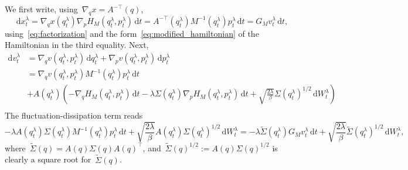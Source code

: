 \documentclass[10pt]{article}
\renewcommand{\d}{\mathrm{d}}
\newcommand{\1}{\mathbbm 1}
\begin{document}
We first write, using~$\nabla_q x = A^{-\top}(q)$,
\begin{equation}
    \d x_t^\lambda = \nabla_q x(q_t^\lambda)\nabla_p H_M(q_t^\lambda,p_t^\lambda)\,\d t = A^{-\top}(q_t^\lambda)M^{-1}(q_t^\lambda)p_t^\lambda\,\d t = G_M v_t^\lambda\,\d t,
\end{equation}
using~\eqref{eq:factorization} and the form~\eqref{eq:modified_hamiltonian} of the Hamiltonian in the third equality. Next,
\begin{equation}
    \begin{aligned}
    \d v_t^\lambda &= \nabla_q v(q_t^\lambda,p_t^\lambda)\,\d q_t^\lambda + \nabla_p v(q_t^\lambda,p_t^\lambda)\,\d p_t^\lambda\\
    &= \nabla_q v(q_t^\lambda,p_t^\lambda)M^{-1}(q_t^\lambda)p_t^\lambda\,\d t\\
    &+ A(q_t^\lambda)\left(-\nabla_q H_M(q_t^\lambda,p_t^\lambda)\,\d t -\lambda\Sigma(q_t^\lambda)\nabla_p H_M(q_t^\lambda,p_t^\lambda)\,\d t + \sqrt{\frac{2\lambda}{\beta}}\Sigma(q_t^\lambda)^{1/2}\,\d W_t^\lambda\right)\\
    \end{aligned}
\end{equation}
The fluctuation-dissipation term reads
\begin{equation}
    -\lambda A(q_t^\lambda)\Sigma(q_t^\lambda)M^{-1}(q_t^\lambda)p_t^\lambda\,\d t + \sqrt{\frac{2\lambda}{\beta}}A(q_t^\lambda)\Sigma(q_t^\lambda)^{1/2}\,\d W_t^\lambda = -\lambda \widetilde{\Sigma}(q_t^\lambda)G_M v_t^\lambda \,\d t+ \sqrt{\frac{2\lambda}{\beta}}\widetilde{\Sigma}(q_t^\lambda)^{1/2}\,\d W_t^\lambda,
\end{equation}
where~$\widetilde{\Sigma}(q) = A(q)\Sigma(q)A(q)^\top$, and~$\widetilde{\Sigma}(q)^{1/2}:=A(q)\Sigma(q)^{1/2}$ is clearly a square root for~$\widetilde{\Sigma}(q)$.
\end{document}
